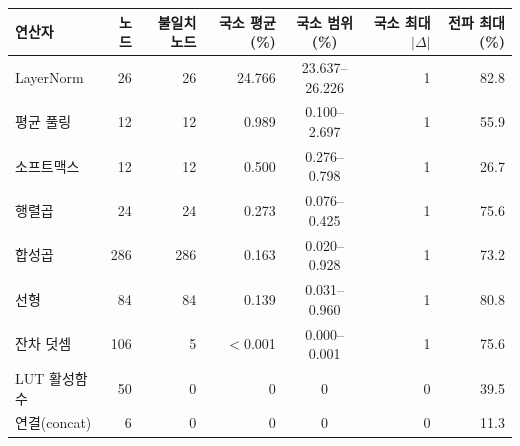 \setlength{\tabcolsep}{5pt}
\begin{tabular}{lrrrcrr}
\toprule
연산자 & 노드 & 불일치 노드 & 국소 평균(\%) & 국소 범위(\%) & 국소 최대 $|\Delta|$ & 전파 최대(\%) \\
\midrule
LayerNorm & 26 & 26 & 24.766 & 23.637--26.226 & 1 & 82.8 \\
평균 풀링 & 12 & 12 & 0.989 & 0.100--2.697 & 1 & 55.9 \\
소프트맥스 & 12 & 12 & 0.500 & 0.276--0.798 & 1 & 26.7 \\
행렬곱 & 24 & 24 & 0.273 & 0.076--0.425 & 1 & 75.6 \\
합성곱 & 286 & 286 & 0.163 & 0.020--0.928 & 1 & 73.2 \\
선형 & 84 & 84 & 0.139 & 0.031--0.960 & 1 & 80.8 \\
잔차 덧셈 & 106 & 5 & $<$0.001 & 0.000--0.001 & 1 & 75.6 \\
LUT 활성함수 & 50 & 0 & 0 & 0 & 0 & 39.5 \\
연결(concat) & 6 & 0 & 0 & 0 & 0 & 11.3 \\
\bottomrule
\end{tabular}
